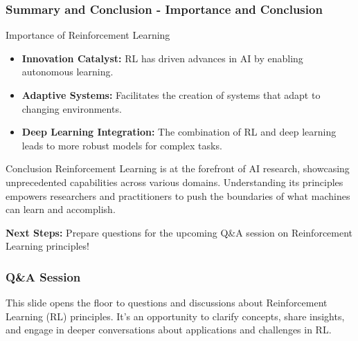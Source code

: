 \documentclass[aspectratio=169]{beamer}
\begin{document}
\begin{frame}[fragile]
    \frametitle{Summary and Conclusion - Importance and Conclusion}
    \begin{block}{Importance of Reinforcement Learning}
        \begin{itemize}
            \item \textbf{Innovation Catalyst:} RL has driven advances in AI by enabling autonomous learning.
            \item \textbf{Adaptive Systems:} Facilitates the creation of systems that adapt to changing environments.
            \item \textbf{Deep Learning Integration:} The combination of RL and deep learning leads to more robust models for complex tasks.
        \end{itemize}
    \end{block}
    
    \begin{block}{Conclusion}
        Reinforcement Learning is at the forefront of AI research, showcasing unprecedented capabilities across various domains. Understanding its principles empowers researchers and practitioners to push the boundaries of what machines can learn and accomplish.
    \end{block}
    
    \textbf{Next Steps:} Prepare questions for the upcoming Q\&A session on Reinforcement Learning principles!
\end{frame}

\begin{frame}[fragile]
    \frametitle{Q\&A Session}
    This slide opens the floor to questions and discussions about Reinforcement Learning (RL) principles. 
    It’s an opportunity to clarify concepts, share insights, and engage in deeper conversations about applications and challenges in RL.
\end{frame}
\end{document}
